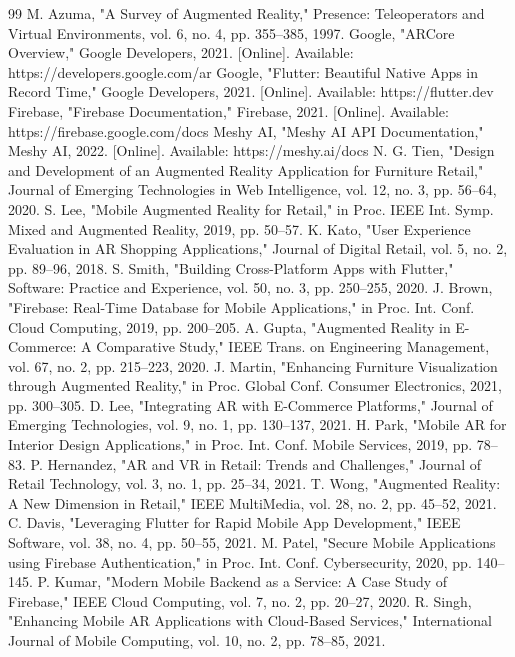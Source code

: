 \documentclass[12pt, a4paper]{article}
\begin{document}
\begin{thebibliography}{99}
 M. Azuma, "A Survey of Augmented Reality," Presence: Teleoperators and Virtual Environments, vol. 6, no. 4, pp. 355--385, 1997.
 Google, "ARCore Overview," Google Developers, 2021. [Online]. Available: https://developers.google.com/ar
 Google, "Flutter: Beautiful Native Apps in Record Time," Google Developers, 2021. [Online]. Available: https://flutter.dev
 Firebase, "Firebase Documentation," Firebase, 2021. [Online]. Available: https://firebase.google.com/docs
 Meshy AI, "Meshy AI API Documentation," Meshy AI, 2022. [Online]. Available: https://meshy.ai/docs
 N. G. Tien, "Design and Development of an Augmented Reality Application for Furniture Retail," Journal of Emerging Technologies in Web Intelligence, vol. 12, no. 3, pp. 56--64, 2020.
 S. Lee, "Mobile Augmented Reality for Retail," in Proc. IEEE Int. Symp. Mixed and Augmented Reality, 2019, pp. 50--57.
 K. Kato, "User Experience Evaluation in AR Shopping Applications," Journal of Digital Retail, vol. 5, no. 2, pp. 89--96, 2018.
 S. Smith, "Building Cross-Platform Apps with Flutter," Software: Practice and Experience, vol. 50, no. 3, pp. 250--255, 2020.
 J. Brown, "Firebase: Real-Time Database for Mobile Applications," in Proc. Int. Conf. Cloud Computing, 2019, pp. 200--205.
 A. Gupta, "Augmented Reality in E-Commerce: A Comparative Study," IEEE Trans. on Engineering Management, vol. 67, no. 2, pp. 215--223, 2020.
 J. Martin, "Enhancing Furniture Visualization through Augmented Reality," in Proc. Global Conf. Consumer Electronics, 2021, pp. 300--305.
 D. Lee, "Integrating AR with E-Commerce Platforms," Journal of Emerging Technologies, vol. 9, no. 1, pp. 130--137, 2021.
 H. Park, "Mobile AR for Interior Design Applications," in Proc. Int. Conf. Mobile Services, 2019, pp. 78--83.
 P. Hernandez, "AR and VR in Retail: Trends and Challenges," Journal of Retail Technology, vol. 3, no. 1, pp. 25--34, 2021.
 T. Wong, "Augmented Reality: A New Dimension in Retail," IEEE MultiMedia, vol. 28, no. 2, pp. 45--52, 2021.
 C. Davis, "Leveraging Flutter for Rapid Mobile App Development," IEEE Software, vol. 38, no. 4, pp. 50--55, 2021.
 M. Patel, "Secure Mobile Applications using Firebase Authentication," in Proc. Int. Conf. Cybersecurity, 2020, pp. 140--145.
 P. Kumar, "Modern Mobile Backend as a Service: A Case Study of Firebase," IEEE Cloud Computing, vol. 7, no. 2, pp. 20--27, 2020.
 R. Singh, "Enhancing Mobile AR Applications with Cloud-Based Services," International Journal of Mobile Computing, vol. 10, no. 2, pp. 78--85, 2021.
\end{thebibliography}
\end{document}
